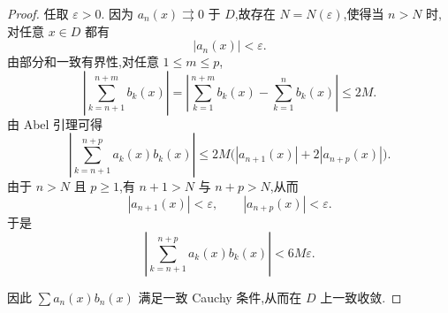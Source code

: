 \begin{proof}
	 任取 $\varepsilon>0$. 因为 $a_n(x)\rightrightarrows0$ 于 $D$,故存在 $N=N(\varepsilon)$,使得当 $n>N$ 时,对任意 $x\in D$ 都有
	\[
	|a_n(x)|<\varepsilon.
	\]
	由部分和一致有界性,对任意 $1\leq m\leq p$,
	\[
	\left|\sum_{k=n+1}^{n+m}b_k(x)\right|
	=
	\left|\sum_{k=1}^{n+m}b_k(x)-\sum_{k=1}^{n}b_k(x)\right|
	\leq 2M.
	\]
	由 Abel 引理可得
	\[
	\left|\sum_{k=n+1}^{n+p}a_k(x)b_k(x)\right|
	\leq
	2M\bigl(|a_{n+1}(x)|+2|a_{n+p}(x)|\bigr).
	\]
	由于 $n>N$ 且 $p\geq1$,有 $n+1>N$ 与 $n+p>N$,从而
	\[
	|a_{n+1}(x)|<\varepsilon,
	\qquad
	|a_{n+p}(x)|<\varepsilon.
	\]
	于是
	\[
	\left|\sum_{k=n+1}^{n+p}a_k(x)b_k(x)\right|
	<6M\varepsilon.
	\]
	
	因此 $\sum a_n(x)b_n(x)$ 满足一致 Cauchy 条件,从而在 $D$ 上一致收敛.
\end{proof}


